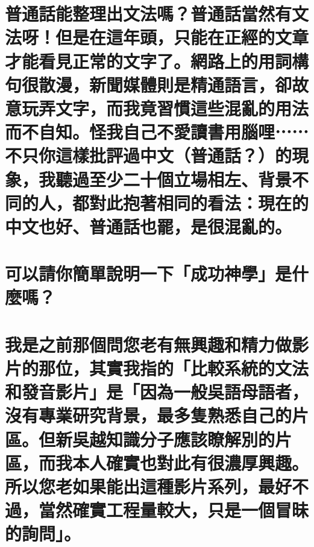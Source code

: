 \chapter[普通話能整理出文法嗎？普通話當然有文法呀！但是在這年頭，只能在正經的文章才能看見正常的文字了。網路上的用詞構句很散漫，新聞媒體則是精通語言，卻故意玩弄文字，而我竟習慣這些混亂的用法而不自知。怪我自己不愛讀書用腦哩⋯⋯不只你這樣批評過中文（普通話？）的現象，我聽過至少二十個立場相左、背景不同的人，都對此抱著相同的看法：現在的中文也好、普通話也罷，是很混亂的。]{普通話能整理出文法嗎？普通話當然有文法呀！但是在這年頭，只能在正經的文章才能看見正常的文字了。網路上的用詞構句很散漫，新聞媒體則是精通語言，卻故意玩弄文字，而我竟習慣這些混亂的用法而不自知。怪我自己不愛讀書用腦哩⋯⋯不只你這樣批評過中文（普通話？）的現象，我聽過至少二十個立場相左、背景不同的人，都對此抱著相同的看法：現在的中文也好、普通話也罷，是很混亂的。}

\chapter[可以請你簡單說明一下「成功神學」是什麼嗎？]{可以請你簡單說明一下「成功神學」是什麼嗎？}

\chapter[我是之前那個問您老有無興趣和精力做影片的那位，其實我指的「比較系統的文法和發音影片」是「因為一般吳語母語者，沒有專業研究背景，最多隻熟悉自己的片區。但新吳越知識分子應該瞭解別的片區，而我本人確實也對此有很濃厚興趣。所以您老如果能出這種影片系列，最好不過，當然確實工程量較大，只是一個冒昧的詢問」。]{我是之前那個問您老有無興趣和精力做影片的那位，其實我指的「比較系統的文法和發音影片」是「因為一般吳語母語者，沒有專業研究背景，最多隻熟悉自己的片區。但新吳越知識分子應該瞭解別的片區，而我本人確實也對此有很濃厚興趣。所以您老如果能出這種影片系列，最好不過，當然確實工程量較大，只是一個冒昧的詢問」。}

